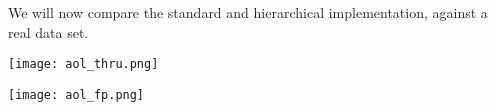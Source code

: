 We will now compare the standard and hierarchical implementation, against a real data set.

\begin{center}
    \texttt{[image: aol\_thru.png]}
\end{center}

\begin{center}
    \texttt{[image: aol\_fp.png]}
\end{center}